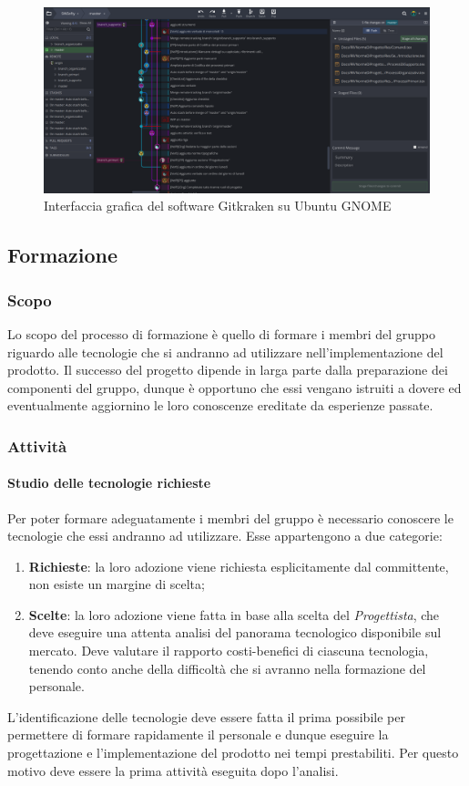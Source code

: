 \begin{figure}[H]
	\centering
	\includegraphics[width=1\textwidth]{Images/gitkraken.png}
	\caption{Interfaccia grafica del software Gitkraken su Ubuntu GNOME}
\end{figure}

\subsection{Formazione}
\label{sec:formazione}

\subsubsection{Scopo}
Lo scopo del processo di formazione è quello di formare i membri del gruppo riguardo alle tecnologie che si andranno ad utilizzare nell'implementazione del prodotto. Il successo del progetto dipende in larga parte dalla preparazione dei componenti del gruppo, dunque è opportuno che essi vengano istruiti a dovere ed eventualmente aggiornino le loro conoscenze ereditate da esperienze passate.
\subsubsection{Attività}
	\paragraph{Studio delle tecnologie richieste} \Spazio
	Per poter formare adeguatamente i membri del gruppo è necessario conoscere le tecnologie che essi andranno ad utilizzare. Esse appartengono a due categorie: 
	\begin{enumerate}
		\item \textbf{Richieste}: la loro adozione viene richiesta esplicitamente dal committente, non esiste un margine di scelta;
		
		\item \textbf{Scelte}: la loro adozione viene fatta in base alla scelta del \emph{Progettista}, che deve eseguire una attenta analisi del panorama tecnologico disponibile sul mercato. Deve valutare il rapporto costi-benefici di ciascuna tecnologia, tenendo conto anche della difficoltà che si avranno nella formazione del personale.
	\end{enumerate}
	L'identificazione delle tecnologie deve essere fatta il prima possibile per permettere di formare rapidamente il personale e dunque eseguire la progettazione e l'implementazione del prodotto nei tempi prestabiliti. Per questo motivo deve essere la prima attività eseguita dopo l'analisi. 

